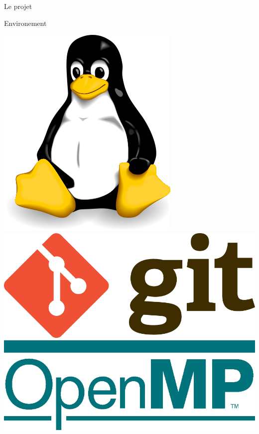 \documentclass[compress,pdf,11pt,xcolor=dvipsnames]{beamer}
\begin{document}
\begin{frame}{Le projet}
  \begin{greyblock}{Environement}
    \begin{center}
      \includegraphics[scale=0.1]{img/linux}
      \hspace{3mm}
      \includegraphics[scale=0.3]{img/git}
      \hspace{3mm}
      \includegraphics[scale=0.1]{img/openmp}
      \hspace{3mm}

\end{center}
\end{greyblock}
\end{frame}
\end{document}
